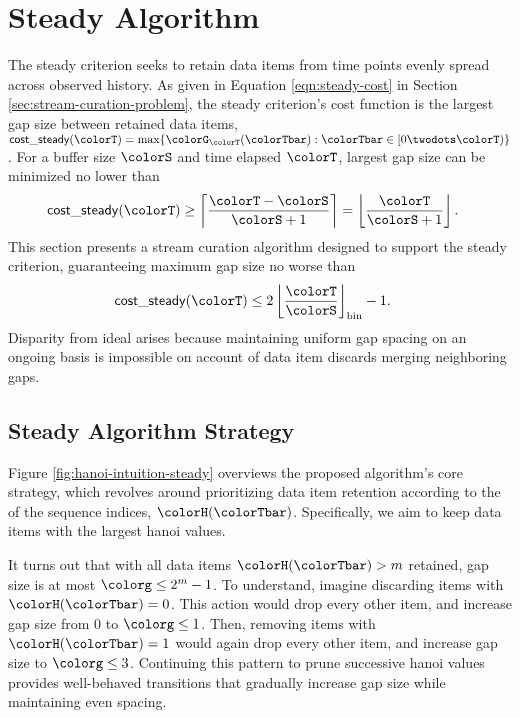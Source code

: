 \section{Steady Algorithm} \label{sec:steady}

The steady criterion seeks to retain data items from time points evenly spread across observed history.
As given in Equation \ref{eqn:steady-cost} in Section \ref{sec:stream-curation-problem}, the steady criterion's cost function is the largest gap size between retained data items, $\mathsf{cost\_steady}(\colorT) = \max\{\colorG_{\colorT}(\colorTbar) : \colorTbar \in [0 \twodots \colorT)\}$.
For a buffer size $\colorS$ and time elapsed $\colorT$, largest gap size can be minimized no lower than
\begin{align}
\mathsf{cost\_steady}(\colorT)
&\geq
\left\lceil
\frac{\colorT - \colorS}{\colorS + 1}
\right\rceil
=
\left\lfloor
\frac{\colorT}{\colorS + 1}
\right\rfloor.
\label{eqn:steady-optimal-gap-size}
\end{align}
This section presents a stream curation algorithm designed to support the steady criterion, guaranteeing maximum gap size no worse than
\begin{align*}
\mathsf{cost\_steady}(\colorT)
&\leq 2 \left\lfloor \frac{\colorT}{\colorS} \right\rfloor_{\mathrm{bin}} - 1.
\end{align*}
Disparity from ideal arises because maintaining uniform gap spacing on an ongoing basis is impossible on account of data item discards merging neighboring gaps.

\subsection{Steady Algorithm Strategy}
\label{sec:steady-strategy}

Figure \ref{fig:hanoi-intuition-steady} overviews the proposed algorithm's core strategy, which revolves around prioritizing data item retention according to the \hv{} of the sequence indices, $\colorH(\colorTbar)$.
Specifically, we aim to keep data items with the largest hanoi values.

It turns out that with all data items $\colorH(\colorTbar) > m$ retained, gap size is at most $\colorg \leq 2^m - 1$.
To understand, imagine discarding items with $\colorH(\colorTbar) = 0$.
This action would drop every other item, and increase gap size from 0 to $\colorg \leq 1$.
Then, removing items with $\colorH(\colorTbar) = 1$ would again drop every other item, and increase gap size to $\colorg \leq 3$.
Continuing this pattern to prune successive hanoi values provides well-behaved transitions that gradually increase gap size while maintaining even spacing.


